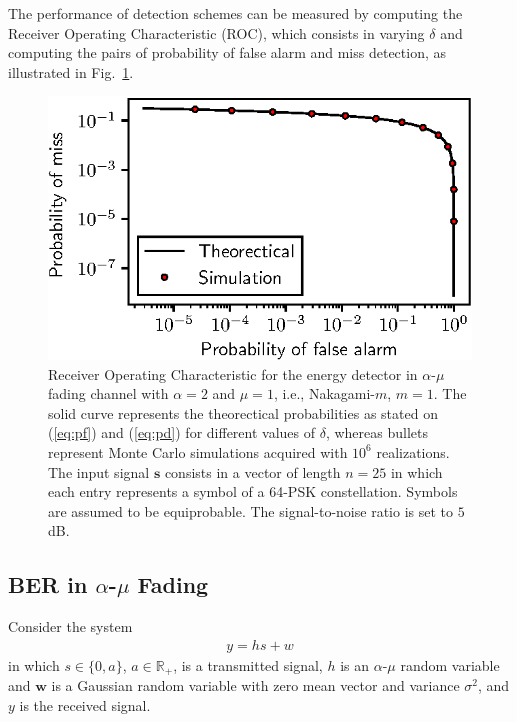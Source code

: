 \documentclass[conference, 10pt]{IEEEtran}
\begin{document}
The performance of detection schemes can be measured by computing the Receiver Operating
Characteristic (ROC), which consists in varying $\delta$ and computing the pairs of
probability of false alarm and miss detection, as illustrated in Fig.~\ref{fig:spectrum-sensing}.

\begin{figure}[!htb]
    \centering
    \includegraphics{figures/spectrum_sensing.eps}
    \caption{Receiver Operating Characteristic for the energy detector in $\alpha$-$\mu$
             fading channel with $\alpha=2$ and $\mu=1$, i.e., Nakagami-$m$, $m = 1$.
             The solid curve represents the theorectical probabilities as stated on
             (\ref{eq:pf}) and (\ref{eq:pd}) for different values of
             $\delta$, whereas bullets represent Monte Carlo simulations acquired with $10^6$ realizations.
             The input signal $\bm{s}$ consists in a vector of length $n=25$ in which each entry represents
             a symbol of a 64-PSK constellation. Symbols are assumed to be equiprobable.
             The signal-to-noise ratio is set to $5$ dB.}
    \label{fig:spectrum-sensing}
\end{figure}

\subsection{BER in $\alpha$-$\mu$ Fading}

Consider the system
\begin{align}
    y = hs + w
\end{align}
in which $s \in \{0, a\}$, $a \in \mathbb{R}_{+}$, is a transmitted signal,
$h$ is an $\alpha$-$\mu$ random variable and $\bm{w}$ is a Gaussian random variable
with zero mean vector and variance $\sigma^2$, and $y$ is the received signal.
\end{document}
